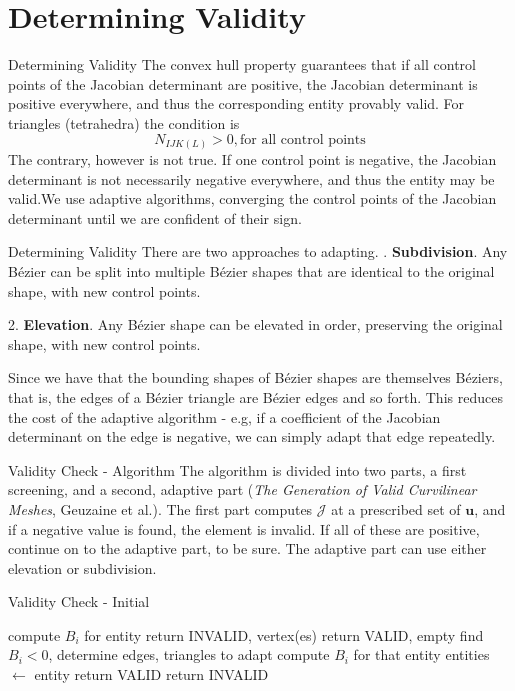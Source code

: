 \documentclass[12pt]{beamer}
\newcommand{\spa}{\vspace{0.5cm}\newline}
\begin{document}
\section{Determining Validity}
\begin{frame}{Determining Validity}
The convex hull property guarantees that if all control points of the Jacobian determinant are positive, the Jacobian determinant is positive everywhere, and thus the corresponding entity provably valid. For triangles (tetrahedra) the condition is
\[ N_{IJK(L)} > 0, \text{for all control points}\]
The contrary, however is not true. If one control point is negative, the Jacobian determinant is not necessarily negative everywhere, and thus the entity may be valid.\spa We use adaptive algorithms, converging the control points of the Jacobian determinant until we are confident of their sign.
\end{frame}
\begin{frame}{Determining Validity}
There are two approaches to adapting. \spa
1. {\bf Subdivision}. Any B{\'e}zier  can be split into multiple B{\'e}zier shapes that are identical to the original shape, with new control points.

2. {\bf Elevation}. Any B{\'e}zier shape can be elevated in order, preserving the original shape, with new control points. \spa

Since we have that the bounding shapes of B{\'e}zier shapes are themselves B{\'e}ziers, that is, the edges of a B{\'e}zier triangle are B{\'e}zier edges and so forth. This reduces the cost of the adaptive algorithm - e.g, if a coefficient of the Jacobian determinant on the edge is negative, we can simply adapt that edge repeatedly.
\end{frame}
\begin{frame}{Validity Check - Algorithm}
The algorithm is divided into two parts, a first screening, and a second, adaptive part ({\it The Generation of Valid Curvilinear Meshes}, Geuzaine et al.). \spa
The first part computes $\mathcal{J}$ at a prescribed set of $\mathbf{u}$, and if a negative value is found, the element is invalid. If all of these are positive, continue on to the adaptive part, to be sure. The adaptive part can use either elevation or subdivision.
\end{frame}
\begin{frame}{Validity Check - Initial}\scriptsize
\begin{algorithmic}[1]
\State compute $B_i$ for entity
\State return INVALID, vertex(es) 
\EndIf
{} 
\State return VALID, empty 
\Else
\State find $B_i < 0$, determine edges, triangles to adapt
    \State compute $B_i$ for that entity
    \State entities $\gets$ entity
    \EndIf
  \EndFor
\EndIf
{}
\State return VALID
\Else
\State return INVALID
\EndIf
\EndFunction
\end{algorithmic}
\end{frame}
\end{document}
